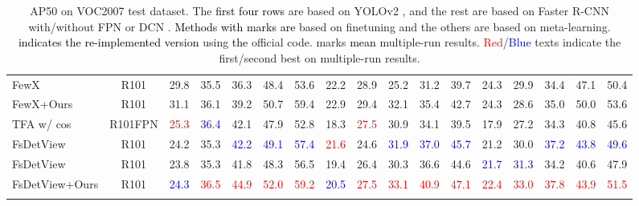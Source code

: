 \documentclass[10pt,twocolumn,letterpaper]{article}
\newcommand{\nj}[1]{\textcolor{black}{#1}}
\begin{document}
\begin{table*}
\begin{center}
\begin{tabular}{|l|c|| c|c|c|c|c|| c|c|c|c|c|| c|c|c|c|c|}
    FewX          & R101     & 29.8 & 35.5 & 36.3 & 48.4 & 53.6 & 22.2 & 28.9 & 25.2  & 31.2  & 39.7 & 24.3 & 29.9 & 34.4 & 47.1 & 50.4 \\
    \rowcolor{Gray}
    FewX+Ours         & R101       & 31.1 & 36.1 & 39.2 & 50.7 & 59.4 & 22.9 & 29.4 & 32.1 & 35.4 & 42.7 & 24.3 & 28.6 & 35.0 & 50.0 & 53.6 \\ 
    \hline \hline 
    TFA w/ cos   \cite{wang2020frustratingly} & R101FPN     & \textcolor{red}{25.3}  & \textcolor{blue}{36.4} & 42.1 & 47.9 & 52.8 & 18.3 & \textcolor{red}{27.5} & 30.9 & 34.1 & 39.5 & 17.9 & 27.2 & 34.3 &  40.8 & 45.6\\
    FsDetView  \cite{xiao2020few}  & R101       &24.2 & 35.3 & \textcolor{blue}{42.2} & \textcolor{blue}{49.1} & \textcolor{blue}{57.4} & \textcolor{red}{21.6} & 24.6 & \textcolor{blue}{31.9} & \textcolor{blue}{37.0} & \textcolor{blue}{45.7} & 21.2 &30.0 &\textcolor{blue}{37.2} & \textcolor{blue}{43.8} & \textcolor{blue}{49.6} \\
    FsDetView   & R101  & 23.8 & 35.3 & 41.8 & 48.3 & 56.5 &  19.4 & 26.4 & 30.3 & 36.6 & 44.6 & \textcolor{blue}{21.7} & \textcolor{blue}{31.3} & 34.2 & 40.6 & 47.9 \\
    \rowcolor{Gray}
    FsDetView+Ours      & R101       & \textcolor{blue}{24.3} & \textcolor{red}{36.5} & \textcolor{red}{44.9} & \textcolor{red}{52.0} & \textcolor{red}{59.2} & \textcolor{blue}{20.5} & \textcolor{red}{27.5} & \textcolor{red}{33.1} & \textcolor{red}{40.9} & \textcolor{red}{47.1} & \textcolor{red}{22.4} & \textcolor{red}{33.0} & \textcolor{red}{37.8} & \textcolor{red}{43.9} & \textcolor{red}{51.5} \\
    \rowcolor{Gray}
\hline
\end{tabular}
\end{center}  
\vspace{-0.10cm}
\caption{AP50 on VOC2007 test dataset. The \nj{first four rows} are based on YOLOv2 \cite{redmon2017yolo9000}, and the rest are based on Faster R-CNN \cite{ren2015faster} with/without FPN \cite{lin2017feature} or DCN \cite{dai2017deformable}. \nj{Methods with  marks are} based on finetuning and the others are based on meta-learning.   \nj{indicates the re-implemented version} using \nj{the} official code.  marks \nj{mean} multiple-run results. \textcolor{red}{Red}/\textcolor{blue}{Blue} texts indicate the first/second best on multiple-run results.}
\label{table:voc_novel}
\end{table*}
\end{document}
